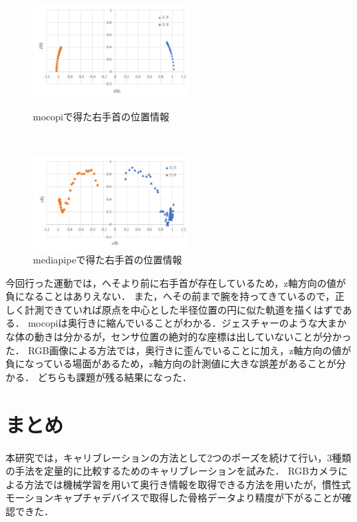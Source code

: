 \documentclass[titlepage]{jarticle}
\begin{document}
\begin{figure}[h]
  \centering
  \begin{minipage}{6cm}
    \centering
    \includegraphics[width=6cm]{img/1_mocopi.png}
    \caption{mocopiで得た右手首の位置情報}
    \label{fig:1_mocopi}
  \end{minipage}\\
  \begin{minipage}{6cm}
    \centering
    \includegraphics[width=6cm]{img/1_media.png}
    \caption{mediapipeで得た右手首の位置情報}
    \label{fig:1_media}
  \end{minipage}
\end{figure}

今回行った運動では，へそより前に右手首が存在しているため，z軸方向の値が負になることはありえない．
また，へその前まで腕を持ってきているので，正しく計測できていれば原点を中心とした半径位置の円に似た軌道を描くはずである．
mocopiは奥行きに縮んでいることがわかる．ジェスチャーのような大まかな体の動きは分かるが，センサ位置の絶対的な座標は出していないことが分かった．
RGB画像による方法では，奥行きに歪んでいることに加え，z軸方向の値が負になっている場面があるため，z軸方向の計測値に大きな誤差があることが分かる．
どちらも課題が残る結果になった．
\section{まとめ}
本研究では，キャリブレーションの方法として2つのポーズを続けて行い，3種類の手法を定量的に比較するためのキャリブレーションを試みた．
RGBカメラによる方法では機械学習を用いて奥行き情報を取得できる方法を用いたが，慣性式モーションキャプチャデバイスで取得した骨格データより精度が下がることが確認できた．
\end{document}
